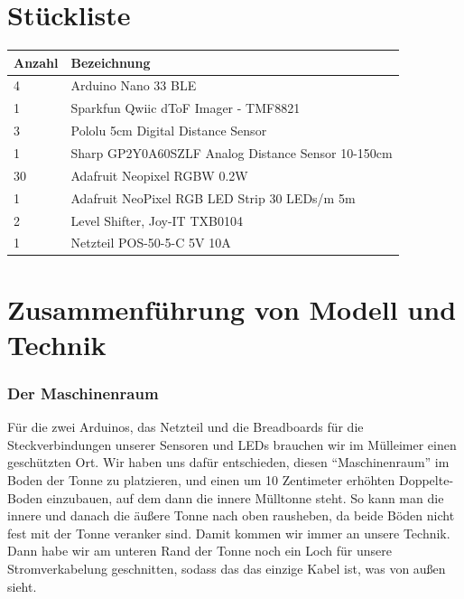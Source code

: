 \section{Stückliste}
    \begin{table}[H]
        \centering
        \begin{tabularx}{\textwidth}{ | l | X | }\hline
            \textbf{Anzahl} & \textbf{Bezeichnung} \\\hline
            4               & Arduino Nano 33 BLE \\\hline
            1               & Sparkfun Qwiic dToF Imager - TMF8821 \\\hline
            3               & Pololu 5cm Digital Distance Sensor \\\hline
            1               & Sharp GP2Y0A60SZLF Analog Distance Sensor 10-150cm \\\hline
            30              & Adafruit Neopixel RGBW 0.2W \\\hline            1               & Adafruit NeoPixel RGB LED Strip 30 LEDs/m 5m \\\hline
            2               & Level Shifter, Joy-IT TXB0104 \\\hline
            1               & Netzteil POS-50-5-C 5V 10A \\\hline
        \end{tabularx}
    \end{table}

\section{Zusammenführung von Modell und Technik}

    \subsubsection{Der Maschinenraum}
        
        Für die zwei Arduinos, das Netzteil und die Breadboards für die Steckverbindungen unserer Sensoren und LEDs brauchen wir im Mülleimer einen geschützten Ort. Wir haben uns dafür entschieden, diesen \enquote{Maschinenraum} im Boden der Tonne zu platzieren, und einen um 10 Zentimeter erhöhten Doppelte-Boden einzubauen, auf dem dann die innere Mülltonne steht.
        So kann man die innere und danach die äußere Tonne nach oben rausheben, da beide Böden nicht fest mit der Tonne veranker sind.
        Damit kommen wir immer an unsere Technik.
        Dann habe wir am unteren Rand der Tonne noch ein Loch für unsere Stromverkabelung geschnitten, sodass das das einzige Kabel ist, was von außen sieht.

